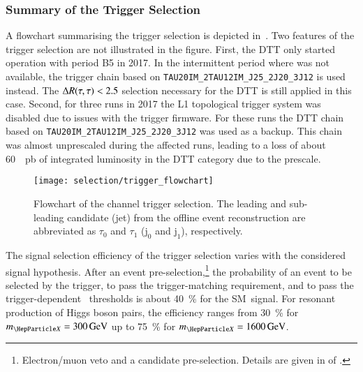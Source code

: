 \subsubsection{Summary of the Trigger Selection}

A flowchart summarising the trigger selection is depicted
in~. Two features of the trigger selection
are not illustrated in the figure. First, the \LOneTopo DTT only started
operation with period B5 in 2017. In the intermittent period where \LOneTopo was
not available, the \tauhadvis trigger chain based on
\texttt{TAU20IM\_2TAU12IM\_J25\_2J20\_3J12} is used instead. The
$\Delta R(\tau, \tau) < 2.5$ selection necessary for the \LOneTopo DTT is still applied in
this case. Second, for three runs in 2017 the L1 topological trigger system was
disabled due to issues with the trigger firmware. For these runs the DTT chain
based on \texttt{TAU20IM\_2TAU12IM\_J25\_2J20\_3J12} was used as a backup. This
chain was almost unprescaled during the affected runs, leading to a loss of
about \SI{60}{\per\pico\barn} of integrated luminosity in the \LOneTopo DTT
category due to the prescale.

\begin{figure}[htbp]
  \centering

  \vspace*{0.25em}

  \texttt{[image: selection/trigger\_flowchart]}

  \vspace*{0.1em}

  \caption[Flowchart of the \hadhad channel trigger selection.]{Flowchart of the
    \hadhad channel trigger selection. The leading and sub-leading \tauhadvis
    candidate (jet) from the offline event reconstruction are abbreviated as
    $\tau_0$ and $\tau_1$ ($\text{j}_0$ and $\text{j}_1$), respectively.}%
  \label{fig:trigger_selection_flowchart}
\end{figure}

The signal selection efficiency of the trigger selection varies with the
considered signal hypothesis. After an event
pre-selection,\footnote{Electron/muon veto and a \tauhadvis candidate
  pre-selection. Details are given in  of
  .} the probability of an event to be selected by
the trigger, to pass the trigger-matching requirement, and to pass the
trigger-dependent \tauhadvis~\pT thresholds is about \SI{40}{\percent} for the
SM~\HH signal. For resonant production of Higgs boson pairs, the efficiency
ranges from \SI{30}{\percent} for $\mX = \SI{300}{\GeV}$ up to \SI{75}{\percent}
for $\mX = \SI{1600}{\GeV}$.

